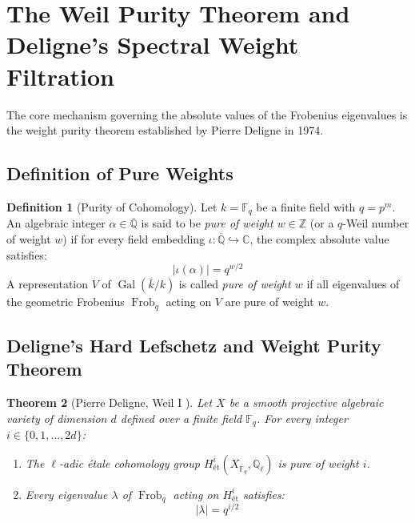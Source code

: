 \documentclass[11pt,a4paper]{article}
\newtheorem{theorem}{Theorem}[section]
\theoremstyle{definition}
\newtheorem{definition}[theorem]{Definition}
\begin{document}
\newpage

\section{The Weil Purity Theorem and Deligne's Spectral Weight Filtration}
The core mechanism governing the absolute values of the Frobenius eigenvalues is the weight purity theorem established by Pierre Deligne in 1974.

\subsection{Definition of Pure Weights}
\begin{definition}[Purity of Cohomology]\label{def:pure_cohomology}
Let $k = \mathbb{F}_q$ be a finite field with $q = p^m$. An algebraic integer $\alpha \in \overline{\mathbb{Q}}$ is said to be \emph{pure of weight $w \in \mathbb{Z}$} (or a $q$-Weil number of weight $w$) if for every field embedding $\iota : \overline{\mathbb{Q}} \hookrightarrow \mathbb{C}$, the complex absolute value satisfies:
\begin{equation}\label{eq:weil_purity_def}
|\iota(\alpha)| = q^{w/2}
\end{equation}
A representation $V$ of $\operatorname{Gal}(\bar{k}/k)$ is called \emph{pure of weight $w$} if all eigenvalues of the geometric Frobenius $\operatorname{Frob}_q$ acting on $V$ are pure of weight $w$.
\end{definition}

\subsection{Deligne's Hard Lefschetz and Weight Purity Theorem}
\begin{theorem}[Pierre Deligne, Weil I \cite{deligne1974}]\label{thm:deligne_weil_1}
Let $X$ be a smooth projective algebraic variety of dimension $d$ defined over a finite field $\mathbb{F}_q$. For every integer $i \in \{0, 1, \dots, 2d\}$:
\begin{enumerate}
    \item The $\ell$-adic étale cohomology group $H^i_{\text{ét}}(X_{\bar{\mathbb{F}}_q}, \mathbb{Q}_\ell)$ is pure of weight $i$.
    \item Every eigenvalue $\lambda$ of $\operatorname{Frob}_q$ acting on $H^i_{\text{ét}}$ satisfies:
    \begin{equation}\label{eq:deligne_norm}
    |\lambda| = q^{i/2}
    \end{equation}
\end{enumerate}
\end{theorem}
\end{document}
